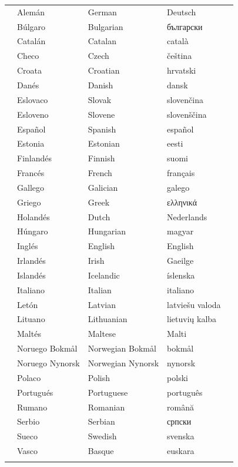 \vspace*{-5mm}
\centering
  \setlength{\tabcolsep}{2.2em}
  \begin{tabularx}{\textwidth}{lllll} \toprule\addlinespace
  &Alemán & German & Deutsch& \\
  &Búlgaro & Bulgarian & български& \\
  &Catalán & Catalan & català& \\
  &Checo & Czech & čeština& \\
  &Croata & Croatian & hrvatski& \\
  &Danés & Danish & dansk& \\
  &Eslovaco & Slovak & slovenčina& \\
  &Esloveno & Slovene & slovenščina& \\
  &Español & Spanish & español& \\
  &Estonia & Estonian & eesti& \\
  &Finlandés & Finnish & suomi& \\
  &Francés & French & français& \\
  &Gallego & Galician & galego& \\
  &Griego & Greek & ελληνικά& \\
  &Holandés & Dutch & Nederlands& \\
  &Húngaro & Hungarian & magyar& \\
  &Inglés & English & English& \\
  &Irlandés & Irish & Gaeilge& \\
  &Islandés & Icelandic & íslenska& \\
  &Italiano & Italian & italiano& \\
  &Letón & Latvian & latviešu valoda& \\
  &Lituano & Lithuanian & lietuvių kalba& \\
  &Maltés & Maltese & Malti& \\
  &Noruego Bokmål & Norwegian Bokmål & bokmål& \\
  &Noruego Nynorsk & Norwegian Nynorsk & nynorsk& \\
  &Polaco & Polish & polski& \\
  &Portugués & Portuguese & português& \\
  &Rumano & Romanian & română& \\
  &Serbio & Serbian & српски& \\
  &Sueco & Swedish & svenska& \\
  &Vasco & Basque & euskara& \\ \addlinespace \bottomrule
\end{tabularx}
